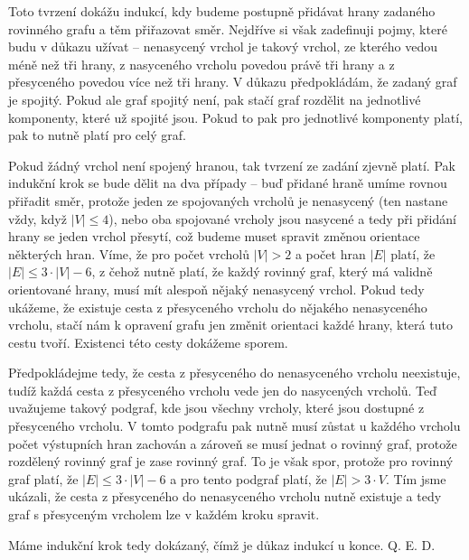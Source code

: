 \documentclass{fkssolpub}
\author{Ondřej Sedláček}
\begin{document}
Toto tvrzení dokážu indukcí, kdy budeme postupně přidávat hrany zadaného rovinného grafu a těm přiřazovat směr. Nejdříve si však zadefinuji pojmy, které budu v důkazu užívat -- nenasycený vrchol je takový vrchol, ze kterého vedou méně než tři hrany, z nasyceného vrcholu povedou právě tři hrany a z přesyceného povedou více než tři hrany. V důkazu předpokládám, že zadaný graf je spojitý. Pokud ale graf spojitý není, pak stačí graf rozdělit na jednotlivé komponenty, které už spojité jsou. Pokud to pak pro jednotlivé komponenty platí, pak to nutně platí pro celý graf.

Pokud žádný vrchol není spojený hranou, tak tvrzení ze zadání zjevně platí. Pak indukční krok se bude dělit na dva případy -- buď přidané hraně umíme rovnou přiřadit směr, protože jeden ze spojovaných vrcholů je nenasycený (ten nastane vždy, když $|V| \leq 4$), nebo oba spojované vrcholy jsou nasycené a tedy při přidání hrany se jeden vrchol přesytí, což budeme muset spravit změnou orientace některých hran. Víme, že pro počet vrcholů $|V| > 2$ a počet hran $|E|$ platí, že $|E| \leq 3 \cdot |V| - 6$, z čehož nutně platí, že každý rovinný graf, který má validně orientované hrany, musí mít alespoň nějaký nenasycený vrchol. Pokud tedy ukážeme, že existuje cesta z přesyceného vrcholu do nějakého nenasyceného vrcholu, stačí nám k opravení grafu jen změnit orientaci každé hrany, která tuto cestu tvoří. Existenci této cesty dokážeme sporem.

Předpokládejme tedy, že cesta z přesyceného do nenasyceného vrcholu neexistuje, tudíž každá cesta z přesyceného vrcholu vede jen do nasycených vrcholů. Teď uvažujeme takový podgraf, kde jsou všechny vrcholy, které jsou dostupné z přesyceného vrcholu. V tomto podgrafu pak nutně musí zůstat u každého vrcholu počet výstupních hran zachován a zároveň se musí jednat o rovinný graf, protože rozdělený rovinný graf je zase rovinný graf. To je však spor, protože pro rovinný graf platí, že $|E| \leq 3 \cdot |V| - 6$ a pro tento podgraf platí, že $|E| > 3 \cdot V$. Tím jsme ukázali, že cesta z přesyceného do nenasyceného vrcholu nutně existuje a tedy graf s přesyceným vrcholem lze v každém kroku spravit.

Máme indukční krok tedy dokázaný, čímž je důkaz indukcí u konce. Q. E. D.
\end{document}
